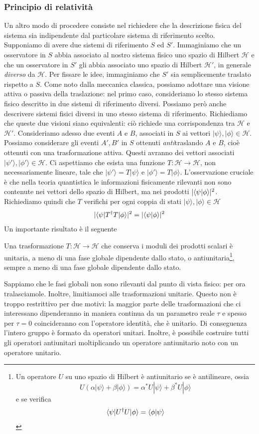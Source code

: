 \documentclass[a4paper, 11pt]{article}
\renewcommand{\H}{\mathcal{H}}
\renewcommand{\ket}[1]{| #1\rangle}
\begin{document}
\subsubsection{Principio di relatività}
Un altro modo di procedere consiste nel richiedere che la descrizione fisica del sistema sia indipendente dal particolare sistema di riferimento scelto. Supponiamo di avere due sistemi di riferimento $S$ ed $S'$. Immaginiamo che un osservatore in $S$ abbia associato al nostro sistema fisico uno spazio di Hilbert $\H$ e che un osservatore in $S'$ gli abbia associato uno spazio di Hilbert $\H'$, in generale \textit{diverso} da $\H$. Per fissare le idee, immaginiamo che $S'$ sia semplicemente traslato rispetto a $S$. Come noto dalla meccanica classica, possiamo adottare una visione attiva o passiva della traslazione: nel primo caso, consideriamo lo stesso sistema fisico descritto in due sistemi di riferimento diversi. Possiamo però anche descrivere sistemi fisici diversi in uno stesso sistema di riferimento. Richiediamo che queste due visioni siano equivalenti: ciò richiede una corrispondenza tra $\H$ e $\H'$. Consideriamo adesso due eventi $A$ e $B$, associati in $S$ ai vettori $\ket\psi,\ket\phi\in\H$. Possiamo considerare gli eventi $A',B'$ in $S$ ottenuti \textit{anti}traslando $A$ e $B$, cioè ottenuti con una trasformazione attiva. Questi avranno dei vettori associati $\ket{\psi'},\ket{\phi'}\in\H$. Ci aspettiamo che esista una funzione $T\colon\H\to\H$, non necessariamente lineare, tale che $\ket{\psi'}=T\ket\psi$ e $\ket{\phi'}=T\ket\phi$. L'osservazione cruciale è che nella teoria quantistica le informazioni fisicamente rilevanti non sono contenute nei vettori dello spazio di Hilbert, ma nei prodotti $|\langle \psi\vert\phi\rangle|^2$. Richiediamo quindi che $T$ verifichi per ogni coppia di stati $\ket\psi,\ket\phi\in\H$
\[|\langle\psi|T^\dagger T|\phi\rangle|^2=|\langle \psi\vert\phi\rangle|^2\]
Un importante risultato è il seguente
\begin{theorem}[Wigner]
	Una trasformazione $T\colon\H\to\H$ che conserva i moduli dei prodotti scalari è unitaria, a meno di una fase globale dipendente dallo stato, o antiunitaria\footnote{Un operatore $U$ su uno spazio di Hilbert è antiunitario se è antilineare, ossia
	\[U(\alpha\ket\psi+\beta\ket\phi)=\alpha^*U\ket\psi+\beta^*U\ket\phi\] e se verifica
\[\langle\psi|U^\dagger U|\phi\rangle=\langle \phi\vert\psi\rangle\]}, sempre a meno di una fase globale dipendente dallo stato.
\end{theorem}
Sappiamo che le fasi globali non sono rilevanti dal punto di vista fisico: per ora tralasciamole. Inoltre, limitiamoci alle trasformazioni unitarie. Questo non è troppo restrittivo per due motivi: la maggior parte delle trasformazioni che ci interessano dipenderanno in maniera continua da un parametro reale $\tau$ e spesso per $\tau=0$ coincideranno con l'operatore identità, che è unitario. Di conseguenza l'intero gruppo è formato da operatori unitari. Inoltre, è possibile costruire tutti gli operatori antiunitari moltiplicando un operatore antiunitario noto con un operatore unitario. 
\end{document}
